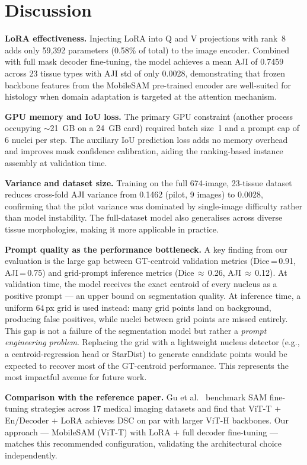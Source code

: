 \documentclass[10pt,twocolumn]{article}
\begin{document}
\section{Discussion}

\textbf{LoRA effectiveness.}
Injecting LoRA into Q and V projections with rank~8 adds only
59,392 parameters (0.58\% of total) to the image encoder.
Combined with full mask decoder fine-tuning, the model achieves
a mean AJI of 0.7459 across 23 tissue types with AJI std of
only 0.0028, demonstrating that frozen backbone features from
the MobileSAM pre-trained encoder are well-suited for histology
when domain adaptation is targeted at the attention mechanism.

\textbf{GPU memory and IoU loss.}
The primary GPU constraint (another process occupying $\sim$21~GB
on a 24~GB card) required batch size~1 and a prompt cap of 6
nuclei per step. The auxiliary IoU prediction loss adds no
memory overhead and improves mask confidence calibration,
aiding the ranking-based instance assembly at validation time.

\textbf{Variance and dataset size.}
Training on the full 674-image, 23-tissue dataset reduces
cross-fold AJI variance from 0.1462 (pilot, 9 images) to
0.0028, confirming that the pilot variance was dominated by
single-image difficulty rather than model instability. The
full-dataset model also generalises across diverse tissue
morphologies, making it more applicable in practice.

\textbf{Prompt quality as the performance bottleneck.}
A key finding from our evaluation is the large gap between
GT-centroid validation metrics (Dice\,=\,0.91, AJI\,=\,0.75)
and grid-prompt inference metrics (Dice\,$\approx$\,0.26,
AJI\,$\approx$\,0.12). At validation time, the model receives
the exact centroid of every nucleus as a positive prompt ---
an upper bound on segmentation quality. At inference time,
a uniform $64$\,px grid is used instead: many grid points land
on background, producing false positives, while nuclei between
grid points are missed entirely. This gap is not a failure of
the segmentation model but rather a \emph{prompt engineering
problem}. Replacing the grid with a lightweight nucleus
detector (e.g., a centroid-regression head or StarDist) to
generate candidate points would be expected to recover most
of the GT-centroid performance. This represents the most
impactful avenue for future work.

\textbf{Comparison with the reference paper.}
Gu et al.~\cite{mazurowski2023sam} benchmark SAM fine-tuning
strategies across 17 medical imaging datasets and find that
ViT-T $+$ En/Decoder $+$ LoRA achieves DSC on par with larger
ViT-H backbones. Our approach --- MobileSAM (ViT-T) with
LoRA $+$ full decoder fine-tuning --- matches this recommended
configuration, validating the architectural choice independently.
\end{document}
